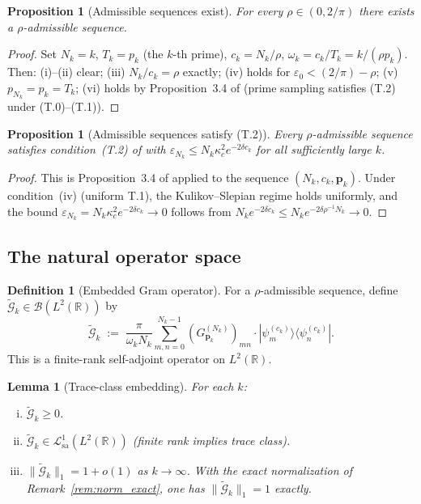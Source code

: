 \documentclass[12pt,a4paper]{amsart}
\newtheorem{lemma}[theorem]{Lemma}
\newtheorem{proposition}[theorem]{Proposition}
\theoremstyle{definition}
\newtheorem{definition}[theorem]{Definition}
\newcommand{\Kul}{\kappa_c}
\newcommand{\GVMk}{G^{(N_k)}_{\mathbf{p}_k}}
\newcommand{\norm}[1]{\|#1\|}
\newcommand{\Lcal}{\mathcal{L}^1_{\mathrm{sa}}}
\begin{document}
\begin{proposition}[Admissible sequences exist]
\label{prop:admissible_exist}
For every $\rho\in(0,2/\pi)$ there exists a $\rho$-admissible
sequence.
\end{proposition}

\begin{proof}
Set $N_k=k$, $T_k=p_k$ (the $k$-th prime), $c_k=N_k/\rho$,
$\omega_k=c_k/T_k=k/(\rho p_k)$. Then:
(i)--(ii) clear; (iii) $N_k/c_k=\rho$ exactly;
(iv) holds for $\varepsilon_0<(2/\pi)-\rho$;
(v) $p_{N_k}=p_k=T_k$;
(vi) holds by Proposition~3.4 of \cite{PaperI}
(prime sampling satisfies (T.2) under (T.0)--(T.1)).
\end{proof}

\begin{proposition}[Admissible sequences satisfy (T.2)]
\label{prop:admissible_T2}
Every $\rho$-admissible sequence satisfies condition~(T.2)
of \cite{PaperI} with $\varepsilon_{N_k}\leq N_k\Kul^2 e^{-2\delta c_k}$
for all sufficiently large $k$.
\end{proposition}

\begin{proof}
This is Proposition~3.4 of \cite{PaperI} applied to the sequence
$(N_k,c_k,\mathbf{p}_k)$. Under condition~(iv) (uniform T.1),
the Kulikov--Slepian regime holds uniformly, and the bound
$\varepsilon_{N_k}=N_k\Kul^2 e^{-2\delta c_k}\to0$ follows from
$N_k e^{-2\delta c_k}\leq N_k e^{-2\delta\rho^{-1}N_k}\to0$.
\end{proof}

\subsection{The natural operator space}

\begin{definition}[Embedded Gram operator]\label{def:embed}
For a $\rho$-admissible sequence, define
$\widetilde{\mathcal{G}}_k\in\mathcal{B}(L^2(\mathbb{R}))$ by
\[
  \widetilde{\mathcal{G}}_k
  \;:=\;
  \frac{\pi}{\omega_k N_k}
  \sum_{m,n=0}^{N_k-1}
  (\GVMk)_{mn}\cdot|\psi_m^{(c_k)}\rangle\langle\psi_n^{(c_k)}|.
\]
This is a finite-rank self-adjoint operator on $L^2(\mathbb{R})$.
\end{definition}

\begin{lemma}[Trace-class embedding]\label{lem:embed}
For each $k$:
\begin{enumerate}[(i)]
\item $\widetilde{\mathcal{G}}_k\geq0$.
\item $\widetilde{\mathcal{G}}_k\in\Lcal(L^2(\mathbb{R}))$
(finite rank implies trace class).
\item $\norm{\widetilde{\mathcal{G}}_k}_1=1+o(1)$ as $k\to\infty$.
With the exact normalization of Remark~\ref{rem:norm_exact},
one has $\norm{\widetilde{\mathcal{G}}_k}_1=1$ exactly.
\end{enumerate}
\end{lemma}
\end{document}
